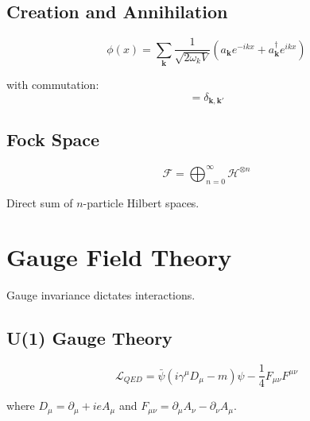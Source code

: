 \subsection{Creation and Annihilation}

\begin{theorem}
\label{thm:mode-expansion}
\begin{equation}
\phi(x) = \sum_{\mathbf{k}}\frac{1}{\sqrt{2\omega_k V}}(a_{\mathbf{k}} e^{-ikx} + a_{\mathbf{k}}^\dagger e^{ikx})
\end{equation}

with commutation:
\begin{equation}
[a_{\mathbf{k}}, a_{\mathbf{k}'}^\dagger] = \delta_{\mathbf{k},\mathbf{k}'}
\end{equation}
\end{theorem}

\subsection{Fock Space}

\begin{definition}
\label{def:fock}
\begin{equation}
\mathcal{F} = \bigoplus_{n=0}^\infty \mathcal{H}^{\otimes n}
\end{equation}

Direct sum of $n$-particle Hilbert spaces.
\end{definition}

\section{Gauge Field Theory}

Gauge invariance dictates interactions.

\subsection{U(1) Gauge Theory}

\begin{definition}
\label{def:qed}
\begin{equation}
\mathcal{L}_{QED} = \bar{\psi}(i\gamma^\mu D_\mu - m)\psi - \frac{1}{4}F_{\mu\nu}F^{\mu\nu}
\end{equation}

where $D_\mu = \partial_\mu + ieA_\mu$ and $F_{\mu\nu} = \partial_\mu A_\nu - \partial_\nu A_\mu$.
\end{definition}

